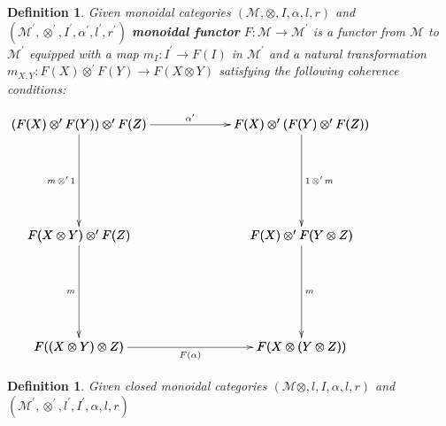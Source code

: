 \documentclass{article}
\newtheorem{definition}[theorem]{Definition}
\let\mto\to
\let\to\relax
\newcommand{\to}{\rightarrow}
\newcommand{\cat}[1]{\mathcal{#1}}
\begin{document}
\begin{definition} Given monoidal categories $(\cat{M}, \otimes, I, \alpha, l, r)$ and $(\cat{M}^\prime, \otimes^\prime, I^\prime, \alpha^\prime, l^\prime, r^\prime)$ \textbf{monoidal functor} $F : \cat{M} \mto \cat{M}^\prime$ is a functor from $\cat{M}$ to $\cat{M}^\prime$ equipped with a map $m_I : I^\prime \mto F(I)$ in $\cat{M}^\prime$ and a natural transformation $m_{X,Y} : F(X) \otimes^\prime F(Y) \mto F(X \otimes Y)$ satisfying the following coherence conditions:
  \begin{center}
    \begin{math}
      \bfig
      \node botleft(0,0)[F((X \otimes Y) \otimes Z)]
      \node midleft(0,900)[F(X \otimes Y) \otimes^\prime F(Z)]
      \node topleft(0,1800)[(F(X) \otimes^\prime F(Y)) \otimes^\prime F(Z)]
      \node botright(1800,0)[F(X \otimes (Y \otimes Z))]
      \node midright(1800,900)[F(X) \otimes^\prime F(Y \otimes Z)]
      \node topright(1800,1800)[F(X) \otimes^\prime (F(Y) \otimes^\prime F(Z))]
      \arrow[topleft`midleft; m \, \otimes^\prime \, 1]
      \arrow[midleft`botleft; m]
      \arrow|b|[botleft`botright; F(\alpha)]
      \arrow[topleft`topright; \alpha^\prime]
      \arrow|r|[topright`midright; 1 \, \otimes^\prime \, m]
      \arrow|r|[midright`botright; m]
      \efig
    \end{math}
    \end{center}
\end{definition}

\begin{definition} Given closed monoidal categories $(\cat{M} \otimes, l, I, \alpha, l, r)$ and $(\cat{M}^\prime, \otimes^\prime, l^\prime, I^\prime, \alpha, l, r)$
\end{definition}
\vspace{-15px}

\nocite{*}


\end{document}
